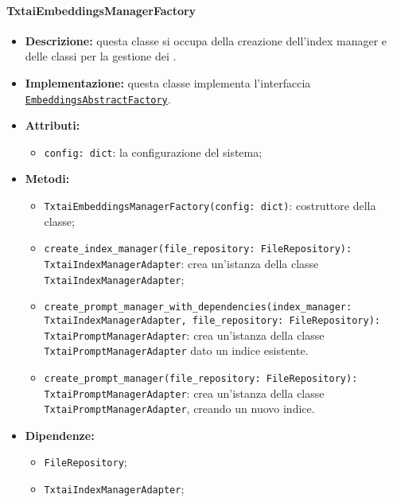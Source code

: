 \paragraph{TxtaiEmbeddingsManagerFactory} \label{TxtaiEmbeddingsManagerFactory}
\begin{itemize}
    \item \textbf{Descrizione:} questa classe si occupa della creazione dell'index manager e delle classi per la gestione dei .
    \item \textbf{Implementazione:} questa classe implementa l'interfaccia \hyperref[EmbeddingsAbstractFactory]{\texttt{EmbeddingsAbstractFactory}}. 
    \item \textbf{Attributi:}
    \begin{itemize}
        \item \texttt{config: dict}: la configurazione del sistema;
    \end{itemize}
    \item \textbf{Metodi:}
    \begin{itemize}
        \item \texttt{TxtaiEmbeddingsManagerFactory(config: dict)}: costruttore della classe;
        \item \texttt{create\_index\_manager(file\_repository: FileRepository): TxtaiIndexManagerAdapter}: crea un'istanza della classe \texttt{TxtaiIndexManagerAdapter};
        \item \texttt{create\_prompt\_manager\_with\_dependencies(index\_manager: TxtaiIndexManagerAdapter, file\_repository: FileRepository): TxtaiPromptManagerAdapter}: crea un'istanza della classe \texttt{TxtaiPromptManagerAdapter} dato un indice esistente.
        \item \texttt{create\_prompt\_manager(file\_repository: FileRepository): TxtaiPromptManagerAdapter}: crea un'istanza della classe \texttt{TxtaiPromptManagerAdapter}, creando un nuovo indice.
    \end{itemize}
    \item \textbf{Dipendenze:}
    \begin{itemize}
        \item \texttt{FileRepository};
        \item \texttt{TxtaiIndexManagerAdapter};
    \end{itemize}
\end{itemize} 

